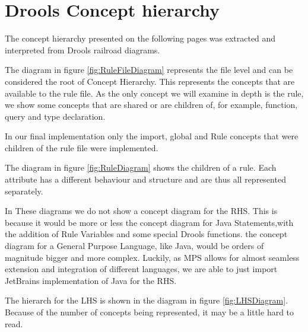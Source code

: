 \chapter{Drools Concept hierarchy}

The concept hierarchy presented on the following pages was extracted and interpreted from Drools railroad diagrams.

The diagram in figure \ref{fig:RuleFileDiagram} represents the file level and can be considered the root of Concept Hierarchy.
This represents the concepts that are available to the rule file.
As the only concept we will examine in depth is the rule, we show some concepts that are shared or are children of, for example, function, query and type declaration.

In our final implementation only the import, global and Rule concepts that were children of the rule file were implemented.

The diagram in figure \ref{fig:RuleDiagram} shows the children of a rule.
Each attribute has a different behaviour and structure and are thus all represented separately.

In These diagrams we do not show a concept diagram for the RHS.
This is because it would be more or less the concept diagram for Java Statements,with the addition of Rule Variables and some special Drools functions.
the concept diagram for a General Purpose Language, like Java, would be orders of magnitude bigger and more complex.
Luckily, as MPS allows for almost seamless extension and integration of different languages, we are able to just import JetBrains implementation of Java for the RHS.

The hierarch for the LHS is shown in the diagram in figure \ref{fig:LHSDiagram}.
Because of the number of concepts being represented, it may be a little hard to read.




